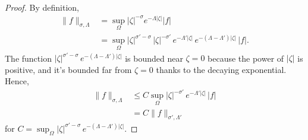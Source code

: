 \documentclass{article}
\theoremstyle{plain}
\begin{document}
\begin{proof}
By definition,
\begin{align*}
\|f\|_{\sigma,\Lambda}&=\sup_{\Omega} |\zeta|^{-\sigma}  e^{-\Lambda |\zeta|} |f|\\
&= \sup_{\Omega} |\zeta|^{\sigma'-\sigma}\,|\zeta|^{-\sigma'}\,e^{-\Lambda'|\zeta|}\,  e^{-(\Lambda-\Lambda') |\zeta|} \, |f|.
\end{align*}
The function $|\zeta|^{\sigma'-\sigma}\,  e^{-(\Lambda-\Lambda') |\zeta|}$ is bounded near $\zeta = 0$ because the power of $|\zeta|$ is positive, and it's bounded far from $\zeta = 0$ thanks to the decaying exponential. Hence,
\begin{align*}
\|f\|_{\sigma,\Lambda}&\leq C\sup_\Omega  |\zeta|^{-\sigma'}\, e^{-\Lambda'|\zeta|} \, |f|\\
&=C \|f\|_{\sigma',\Lambda'}
\end{align*}
for $C = \sup_{\Omega}  |\zeta|^{\sigma'-\sigma}\,  e^{-(\Lambda-\Lambda') |\zeta|}$.
\end{proof}
\end{document}
